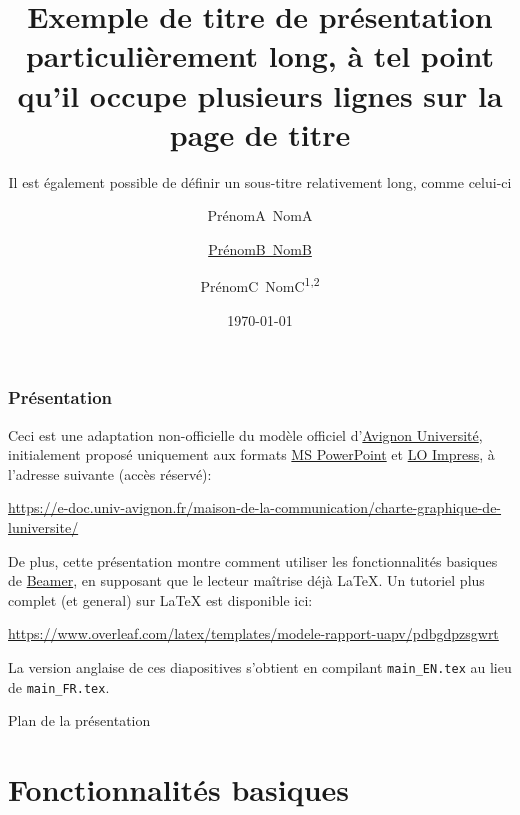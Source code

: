\documentclass[10pt,    %
    french,             %
    xcolor=table,       %
    envcountsect        %
]{beamer}
\title[Titre court] %
    {Exemple de titre de présentation particulièrement long, à tel point qu'il occupe plusieurs lignes sur la page de titre}
\subtitle{Il est également possible de définir un sous-titre relativement long, comme celui-ci}
\date[Date courte]  %
    {\today}        %
\author[Auteur court] %
{PrénomA~NomA\inst{1} \and \underline{PrénomB~NomB}\inst{2} \and PrénomC~NomC\textsuperscript{1,2}}
\institute[] %
{\inst{1} Laboratoire Informatique d'Avignon -- LIA EA 4128 \texttt{\{prénom.nom\}@univ-avignon.fr}
\and \inst{2} Institut d'Innovation Disruptive, Université de l'Excellence \texttt{\{prénom.nom\}@univ-excell.fr}
}
\begin{document}
\begin{frame}
  \titlepage
\end{frame}

\begin{frame}
    \label{frm:first}
    \frametitle{Présentation} 
    
    Ceci est une adaptation non-officielle du modèle officiel d'\href{http://univ-avignon.fr/}{Avignon Université}, initialement proposé uniquement aux formats \href{https://en.wikipedia.org/wiki/Microsoft\_PowerPoint}{MS PowerPoint} et \href{https://en.wikipedia.org/wiki/LibreOffice\#Included\_applications}{LO Impress}, à l'adresse  suivante (accès réservé):
    
    \url{https://e-doc.univ-avignon.fr/maison-de-la-communication/charte-graphique-de-luniversite/}
    
    \vspace{0.25cm}
    De plus, cette présentation montre comment utiliser les fonctionnalités basiques de \href{https://en.wikipedia.org/wiki/Beamer_(LaTeX)}{Beamer}, en supposant que le lecteur maîtrise déjà \LaTeX{}. Un tutoriel plus complet (et general) sur \LaTeX{} est disponible ici: 
    
    \url{https://www.overleaf.com/latex/templates/modele-rapport-uapv/pdbgdpzsgwrt}

    \vspace{0.25cm}
    La version anglaise de ces diapositives s'obtient en compilant \texttt{main\_EN.tex} au lieu de \texttt{main\_FR.tex}.
\end{frame}

\begin{frame}{Plan de la présentation}
    \tableofcontents
\end{frame}












\section{Fonctionnalités basiques}
\label{sec:basics}
\sectionframe

\end{document}
